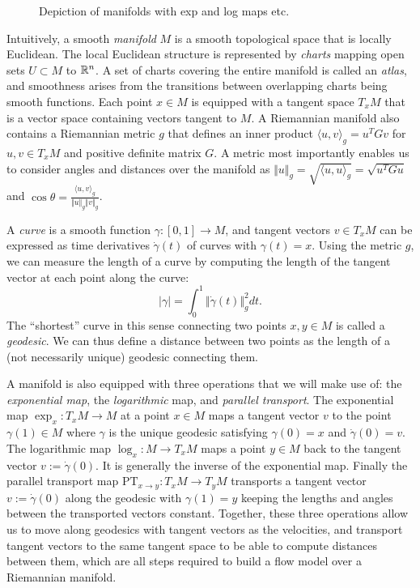 \begin{figure}[t!]
    \caption{\label{fig:manifolds} Depiction of manifolds with exp and log maps etc.}    
\end{figure}

Intuitively, a smooth \textit{manifold} $M$ is a smooth topological space that is locally Euclidean. The local Euclidean structure is represented by \textit{charts} mapping open sets $U \subset M$ to $\mathbb{R}^n$. A set of charts covering the entire manifold is called an \textit{atlas}, and smoothness arises from the transitions between overlapping charts being smooth functions. Each point $x \in M$ is equipped with a tangent space $T_x M$ that is a vector space containing vectors tangent to $M$. A Riemannian manifold also contains a Riemannian metric $g$ that defines an inner product $\langle u, v \rangle_g = u^T G v$ for $u, v \in T_x M$ and positive definite matrix $G$. A metric most importantly enables us to consider angles and distances over the manifold as $\Vert u \Vert_g = \sqrt{\langle u, u\rangle_g} = \sqrt{u^T G u}$ and $\cos \theta = \frac{\langle u, v \rangle_g}{\Vert u \Vert_g \Vert v \Vert_g}$. 

A \textit{curve} is a smooth function $\gamma: [0, 1] \to M$, and tangent vectors $v \in T_x M$ can be expressed as time derivatives $\dot \gamma(t)$ of curves with $\gamma(t) = x$. Using the metric $g$, we can measure the length of a curve by computing the length of the tangent vector at each point along the curve:
\begin{equation}
    \vert \gamma \vert =
    \int_0^1 \Vert \dot \gamma (t) \Vert_g^2 dt.
\end{equation}
The ``shortest'' curve in this sense connecting two points $x,y\in M$ is called a \textit{geodesic}. We can thus define a distance between two points as the length of a (not necessarily unique) geodesic connecting them. 

A manifold is also equipped with three operations that we will make use of: the \textit{exponential map}, the \textit{logarithmic} map, and \textit{parallel transport}. The exponential map $\exp_x: T_x M \to M$ at a point $x \in M$ maps a tangent vector $v$ to the point $\gamma(1) \in M$ where $\gamma$ is the unique geodesic satisfying $\gamma(0) = x$ and $\dot \gamma(0) = v$. The logarithmic map $\log_x: M \to T_x M$ maps a point $y \in M$ back to the tangent vector $v := \dot \gamma (0)$. It is generally the inverse of the exponential map. Finally the parallel transport map $\text{PT}_{x \to y}: T_x M \to T_y M$ transports a tangent vector $v := \dot \gamma(0)$ along the geodesic with $\gamma(1) = y$ keeping the lengths and angles between the transported vectors constant. Together, these three operations allow us to move along geodesics with tangent vectors as the velocities, and transport tangent vectors to the same tangent space to be able to compute distances between them, which are all steps required to build a flow model over a Riemannian manifold. 

